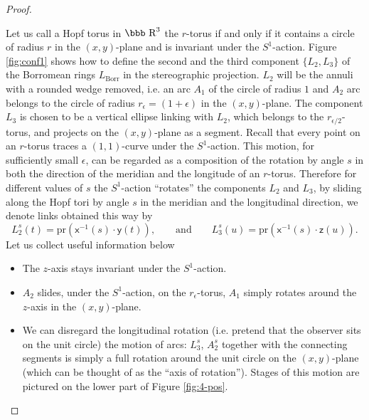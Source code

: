 \documentclass[12pt]{article}
\newcommand{\R}{\mbox{\bbb R}}       %
\begin{document}
\begin{proof}
\begin{figure}
\begin{center}
\end{center}
\end{figure}

Let us call a Hopf torus in $\R^3$ the $r$-torus if and only if it
contains a circle of radius $r$ in the $(x,y)$-plane and is
invariant under the $S^1$-action.
 Figure \ref{fig:conf1} shows how to define the second and the third component $\{L_2, L_3\}$ of the Borromean rings $L_\text{Borr}$ in the stereographic projection.
$L_2$ will be the annuli with a rounded wedge removed, i.e. an arc $A_1$ of the circle
of radius $1$ and $A_2$ arc belongs to the circle of radius $r_\epsilon=(1+\epsilon)$ in the $(x,y)$-plane. 
 The component $L_3$ is chosen to be a vertical ellipse
linking with $L_2$, which belongs to the $r_{\epsilon/2}$-torus, and
projects on the $(x,y)$-plane as a segment. Recall that every point on an $r$-torus traces a
$(1,1)$-curve under the $S^1$-action. This motion, for sufficiently small $\epsilon$, can be regarded 
as a composition
of the rotation by angle $s$ in both the direction of the meridian
and the longitude of an $r$-torus.  Therefore for different values of $s$ the $S^1$-action ``rotates'' the components $L_2$ and $L_3$, by sliding 
along the Hopf tori by angle $s$ in the meridian and the longitudinal
direction, we denote links obtained this way by 
\[
 L^s_2(t)=\text{pr}(\mathsf{x}^{-1}(s)\cdot\mathsf{y}(t)),\qquad \text{and}\qquad  L^s_3(u)=\text{pr}(\mathsf{x}^{-1}(s)\cdot\mathsf{z}(u)).
\]
Let us collect useful information below
\begin{itemize}
\item[$(i)$] The $z$-axis stays invariant under the $S^1$-action.
\item[$(ii)$] $A_2$ slides, under the $S^1$-action, on the $r_\epsilon$-torus, $A_1$ simply
rotates around the $z$-axis in the $(x,y)$-plane.
\item[$(iii)$] We can disregard the longitudinal rotation (i.e.
pretend that the observer sits on the unit circle) the motion of arcs:
$L^s_3$, $A^s_2$ together with the connecting segments is simply a
full rotation around the unit circle on the $(x,y)$-plane (which can be thought of as the ``axis of rotation'').
Stages of this motion are pictured on the lower part of Figure \ref{fig:4-pos}.
\end{itemize}




\end{proof}
\end{document}
